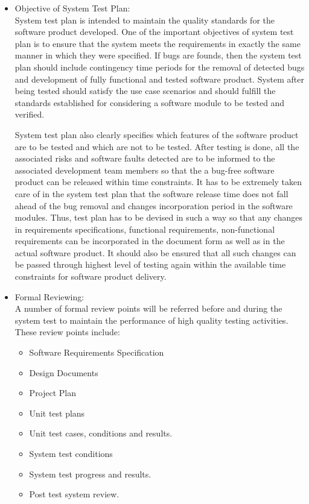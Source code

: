 \documentclass[12pt]{article}
\begin{document}
\begin{itemize}
    \item Objective of System Test Plan:\\
    System test plan is intended to maintain the quality standards for the software product developed. One of the important objectives of system test plan is to ensure that the system meets the requirements in exactly the same manner in which they were specified. If bugs are founds, then the system test plan should include contingency time periods for the removal of detected bugs and development of fully functional and tested software product. System after being tested should satisfy the use case scenarios and should fulfill the standards established for considering a software module to be tested and verified.
    
    System test plan also clearly specifies which features of the software product are to be tested and which are not to be tested. After testing is done, all the associated risks and software faults detected are to be informed to the associated development team members so that the a bug-free software product can be released within time constraints. It has to be extremely taken care of in the system test plan that the software release time does not fall ahead of the bug removal and changes incorporation period in the software modules. Thus, test plan has to be devised in such a way so that any changes in requirements specifications, functional requirements, non-functional requirements can be incorporated in the document form as well as in the actual software product. It should also be ensured that all such changes can be passed through highest level of testing again within the available time constraints for software product delivery.
    \item Formal Reviewing:\\
    A number of formal review points will be referred before and during the system test to maintain the performance of high quality testing activities. These review points include:
	\begin{itemize}
	\item Software Requirements Specification
    \item Design Documents
    \item Project Plan
    \item Unit test plans
    \item Unit test cases, conditions and results.
    \item System test conditions
    \item System test progress and results.
    \item Post test system review.

   
	\end{itemize}

\end{itemize}
\end{document}
